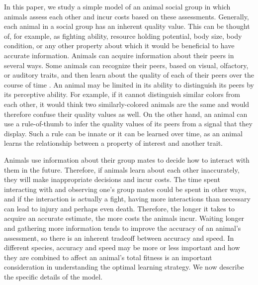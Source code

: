 In this paper, we study a simple model of an animal social group in which animals assess each other and incur costs based on these assessments. Generally, each animal in a social group has an inherent quality value. This can be thought of, for example, as fighting ability, resource holding potential, body size, body condition, or any other property about which it would be beneficial to have accurate information. Animals can acquire information about their peers in several ways. Some animals can recognize their peers, based on visual, olfactory, or auditory traits, and then learn about the quality of each of their peers over the course of time \cite{sheehan2016evotradeoff}. An animal may be limited in its ability to distinguish its peers by its perceptive ability. For example, if it cannot distinguish similar colors from each other, it would think two similarly-colored animals are the same and would therefore confuse their quality values as well. On the other hand, an animal can use a rule-of-thumb to infer the quality values of its peers from a signal that they display. Such a rule can be innate or it can be learned over time, as an animal learns the relationship between a property of interest and another trait. 

Animals use information about their group mates to decide how to interact with them in the future. Therefore, if animals learn about each other inaccurately, they will make inappropriate decisions and incur costs. The time spent interacting with and observing one's group mates could be spent in other ways, and if the interaction is actually a fight, having more interactions than necessary can lead to injury and perhaps even death.  Therefore, the longer it takes to acquire an accurate estimate, the more costs the animals incur. Waiting longer and gathering more information tends to improve the accuracy of an animal's assessment, so there is an inherent tradeoff between accuracy and speed. In different species, accuracy and speed may be more or less important and how they are combined to affect an animal's total fitness is an important consideration in understanding the optimal learning strategy. We now describe the specific details of the model. 

